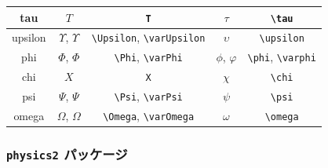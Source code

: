 \documentclass[
    paper=a4paper,      %
    article,            %
    fontsize=11pt,      %
    jafontsize=11pt,    %
    head_space=25mm,    %
    foot_space=25mm,    %
    gutter=20mm,        %
    fore-edge=20mm      %
    ]{jlreq}            %
\begin{document}
\begin{table}[t]
\begin{tabular}{c|c|c|c|c}
        tau & $T$ & \verb|T| & $\tau$ & \verb|\tau| \\ \hline
        upsilon & $\Upsilon$, $\varUpsilon$ & \verb|\Upsilon|, \verb|\varUpsilon| & $\upsilon$ & \verb|\upsilon| \\ \hline
        phi & $\Phi$, $\varPhi$ & \verb|\Phi|, \verb|\varPhi| & $\phi$, $\varphi$ & \verb|\phi|, \verb|\varphi| \\ \hline
        chi & $X$ & \verb|X| & $\chi$ & \verb|\chi| \\ \hline
        psi & $\Psi$, $\varPsi$ & \verb|\Psi|, \verb|\varPsi| & $\psi$ & \verb|\psi| \\ \hline
        omega & $\Omega$, $\varOmega$ & \verb|\Omega|, \verb|\varOmega| & $\omega$ & \verb|\omega| \\ \hline
    \end{tabular}
\end{table}

\clearpage
\subsubsection{\texttt{physics2} パッケージ}
\label{ssec:physics2}
\end{document}
